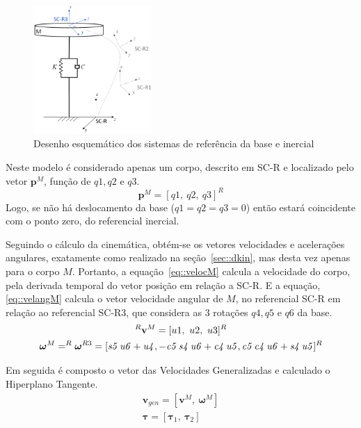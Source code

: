 \begin{figure}[h]
	\centering 
 	\includegraphics[width=0.40\textwidth]{figs/schem_scbase}
 	\caption{Desenho esquemático dos sistemas de referência da base e inercial}
 	\label{fig::schem_scbase}
\end{figure}

Neste modelo é considerado apenas um corpo, descrito em SC-R e localizado pelo
vetor $\mathbf{p}^M$, função de $q1,q2$ e $q3$.
%
\begin{equation}
	\mathbf{p}^M = [q1,~q2,~q3]^R
\end{equation}
%
Logo, se não há deslocamento da base ($q1=q2=q3=0$) então estará coincidente com
o ponto zero, do referencial inercial.

Seguindo o cálculo da cinemática, obtém-se os vetores velocidades e acelerações
angulares, exatamente como realizado na seção~\ref{sec::dkin}, mas desta vez
apenas para o corpo $M$.
Portanto, a equação~\ref{eq::velocM} calcula a velocidade do corpo, pela
derivada temporal do vetor posição em relação a SC-R. E a equação,
\ref{eq::velangM} calcula o vetor velocidade angular de $M$, no referencial SC-R
em relação ao referencial SC-R3, que considera as 3 rotações $q4, q5$ e $q6$ da
base.
%
\begin{gather} 
	^{R}\mathbf{v}^{M} = [u1,~u2,~u3]^R \label{eq::velocM} \\
	\boldsymbol{\omega}^{M} = ^{R}\boldsymbol{\omega}^{R3} = [{\it s5}\,{\it
	u6}+{\it u4},-{\it c5}\,{\it s4}\,{\it u6}+{\it c4}\,{ \it u5},{\it c5}\,{\it c4}\,{\it u6}+{\it s4}\,{\it u5}]^{R}
\label{eq::velangM}
\end{gather}
%

Em seguida é composto o vetor das Velocidades Generalizadas e calculado o
Hiperplano Tangente.
%
\begin{gather}
	\mathbf{v}_{gen} = [ \mathbf{v}^{M},~ \boldsymbol{\omega}^{M}] \\
	\boldsymbol{\tau} = [\boldsymbol{\tau}_1,~ \boldsymbol{\tau}_2]
\end{gather}
%

